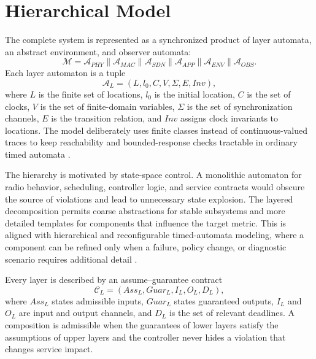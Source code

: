 \documentclass[runningheads]{llncs}
\newcommand{\A}[1]{\mathcal{A}_{#1}}
\newcommand{\Contract}[1]{\mathcal{C}_{#1}}
\newcommand{\Env}{\mathcal{A}_{ENV}}
\begin{document}
\section{Hierarchical Model}

The complete system is represented as a synchronized product of layer automata, an abstract environment, and observer automata:
\begin{equation}
\mathcal{M}=\A{PHY}\parallel\A{MAC}\parallel\A{SDN}\parallel\A{APP}\parallel\Env\parallel\A{OBS}.
\end{equation}
Each layer automaton is a tuple
\begin{equation}
\A{L}=(L,l_0,C,V,\Sigma,E,Inv),
\end{equation}
where $L$ is the finite set of locations, $l_0$ is the initial location, $C$ is the set of clocks, $V$ is the set of finite-domain variables, $\Sigma$ is the set of synchronization channels, $E$ is the transition relation, and $Inv$ assigns clock invariants to locations. The model deliberately uses finite classes instead of continuous-valued traces to keep reachability and bounded-response checks tractable in ordinary timed automata \cite{alur_theory_1994}.

The hierarchy is motivated by state-space control. A monolithic automaton for radio behavior, scheduling, controller logic, and service contracts would obscure the source of violations and lead to unnecessary state explosion. The layered decomposition permits coarse abstractions for stable subsystems and more detailed templates for components that influence the target metric. This is aligned with hierarchical and reconfigurable timed-automata modeling, where a component can be refined only when a failure, policy change, or diagnostic scenario requires additional detail \cite{bettira_reconfigurable_2019,tigane_dynamic_2023}.

Every layer is described by an assume--guarantee contract
\begin{equation}
\Contract{L}=(Ass_L,Guar_L,I_L,O_L,D_L),
\end{equation}
where $Ass_L$ states admissible inputs, $Guar_L$ states guaranteed outputs, $I_L$ and $O_L$ are input and output channels, and $D_L$ is the set of relevant deadlines. A composition is admissible when the guarantees of lower layers satisfy the assumptions of upper layers and the controller never hides a violation that changes service impact.
\end{document}
